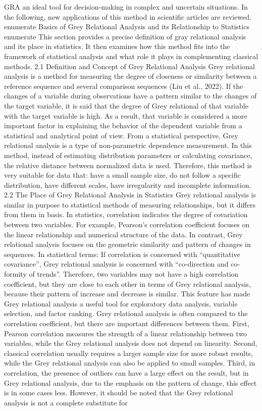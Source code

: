 \documentclass[10pt,twoside]{article}
\begin{document}
\begin{minipage}[t][\textheight]{\textwidth}
GRA an ideal tool for decision-making in complex and uncertain situations. In the following, new applications of this method in scientific articles are reviewed. enumerate Basics of Grey Relational Analysis and its Relationship to Statistics enumerate This section provides a precise definition of gray relational analysis and its place in statistics. It then examines how this method fits into the framework of statistical analysis and what role it plays in complementing classical methods. 2.1 Definition and Concept of Grey Relational Analysis Grey relational analysis is a method for measuring the degree of closeness or similarity between a reference sequence and several comparison sequences (Liu et al., 2022). If the changes of a variable during observations have a pattern similar to the changes of the target variable, it is said that the degree of Grey relational of that variable with the target variable is high. As a result, that variable is considered a more important factor in explaining the behavior of the dependent variable from a statistical and analytical point of view. From a statistical perspective, Grey relational analysis is a type of non-parametric dependence measurement. In this method, instead of estimating distribution parameters or calculating covariance, the relative distance between normalized data is used. Therefore, this method is very suitable for data that: have a small sample size, do not follow a specific distribution, have different scales, have irregularity and incomplete information. 2.2 The Place of Grey Relational Analysis in Statistics Grey relational analysis is similar in purpose to statistical methods of measuring relationships, but it differs from them in basis. In statistics, correlation indicates the degree of covariation between two variables. For example, Pearson's correlation coefficient focuses on the linear relationship and numerical structure of the data. In contrast, Grey relational analysis focuses on the geometric similarity and pattern of changes in sequences. In statistical terms: If correlation is concerned with ``quantitative covariance'', Grey relational analysis is concerned with ``co-direction and co-formity of trends''. Therefore, two variables may not have a high correlation coefficient, but they are close to each other in terms of Grey relational analysis, because their pattern of increase and decrease is similar. This feature has made Grey relational analysis a useful tool for exploratory data analysis, variable selection, and factor ranking. Grey relational analysis is often compared to the correlation coefficient, but there are important differences between them. First, Pearson correlation measures the strength of a linear relationship between two variables, while the Grey relational analysis does not depend on linearity. Second, classical correlation usually requires a larger sample size for more robust results, while the Grey relational analysis can also be applied to small samples. Third, in correlation, the presence of outliers can have a large effect on the result, but in Grey relational analysis, due to the emphasis on the pattern of change, this effect is in some cases less. However, it should be noted that the Grey relational analysis is not a complete substitute for 
\end{minipage}
\end{document}

